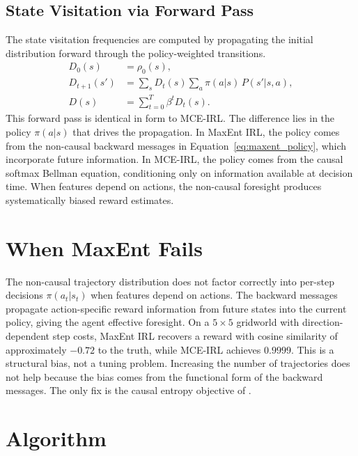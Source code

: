 \documentclass[10pt]{article}
\begin{document}
\subsection{State Visitation via Forward Pass}

The state visitation frequencies are computed by propagating the initial distribution forward through the policy-weighted transitions.
\begin{align}
D_0(s) &= \rho_0(s), \label{eq:forward_init} \\
D_{t+1}(s') &= \sum_s D_t(s) \sum_a \pi(a|s)\, P(s'|s,a), \label{eq:forward_step} \\
D(s) &= \sum_{t=0}^{T} \beta^t D_t(s). \label{eq:forward_total}
\end{align}
This forward pass is identical in form to MCE-IRL. The difference lies in the policy $\pi(a|s)$ that drives the propagation. In MaxEnt IRL, the policy comes from the non-causal backward messages in Equation~\eqref{eq:maxent_policy}, which incorporate future information. In MCE-IRL, the policy comes from the causal softmax Bellman equation, conditioning only on information available at decision time. When features depend on actions, the non-causal foresight produces systematically biased reward estimates.


\section{When MaxEnt Fails}

The non-causal trajectory distribution does not factor correctly into per-step decisions $\pi(a_t|s_t)$ when features depend on actions. The backward messages propagate action-specific reward information from future states into the current policy, giving the agent effective foresight. On a $5 \times 5$ gridworld with direction-dependent step costs, MaxEnt IRL recovers a reward with cosine similarity of approximately $-0.72$ to the truth, while MCE-IRL achieves $0.9999$. This is a structural bias, not a tuning problem. Increasing the number of trajectories does not help because the bias comes from the functional form of the backward messages. The only fix is the causal entropy objective of \citet{ziebart2010}.


\section{Algorithm}
\end{document}

